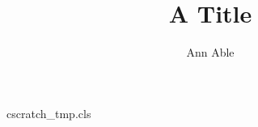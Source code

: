 \begin{filecontents*}[overwrite]{cscratch_tmp.cls}
\def\tmp{}
\newcommand\address[1]{\gdef\tmp{#1}}
\def\@maketitle{\newpage\null\vskip 2em\begin{center}{\LARGE\@title\par}\vskip 1.5em
  {\large\@author\par}\vskip 1em{\tmp\par}\end{center}\par\vskip 1.5em}
\end{filecontents*}
\documentclass{cscratch_tmp}
\title{A Title}\author{Ann Able}
\address{Lunar Institute}
\maketitle
Body text.

